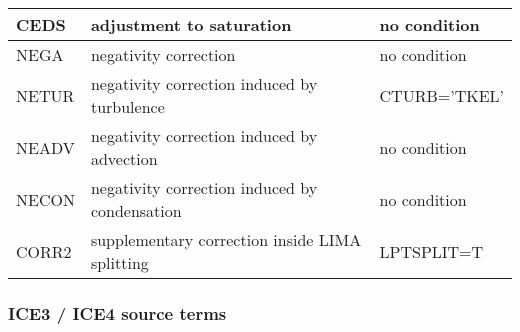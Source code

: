 \begin{longtable} {|p{}|p{}|p{}|}
CEDS   & adjustment to saturation                       & no condition \\\hline
NEGA   & negativity correction                          & no condition \\\hline
NETUR  & negativity correction induced by turbulence    & CTURB='TKEL' \\\hline
NEADV  & negativity correction induced by advection     & no condition \\\hline
NECON  & negativity correction induced by condensation  & no condition \\\hline
CORR2  & supplementary correction inside LIMA splitting & LPTSPLIT=T \\\hline
\end{longtable}

\subsubsection{ICE3 / ICE4 source terms}

